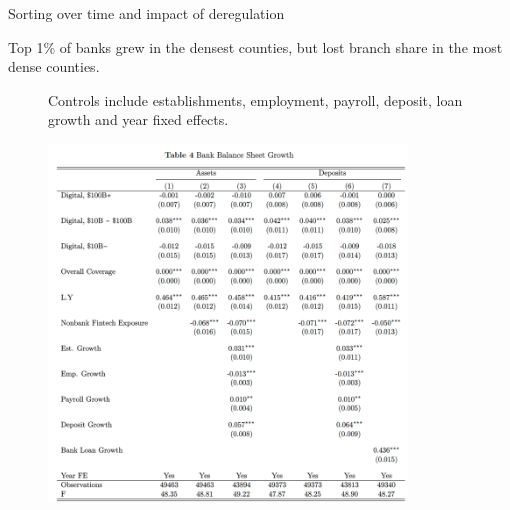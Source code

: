 \documentclass[notes,10pt, aspectratio=169]{beamer}
\newenvironment{wideitemize}{\itemize\addtolength{\itemsep}{10pt}}{\enditemize}
\begin{document}
\begin{frame}{Sorting over time and impact of deregulation}
    \begin{wideitemize}
        \item Top 1\% of banks grew in the densest counties, but lost branch share in the most dense counties. 
\end{wideitemize}

\begin{figure}
\centering
\begin{minipage}{0.9\textwidth}
    {\footnotesize
    Controls include establishments, employment, payroll, deposit, loan growth and year fixed effects.}
    \end{minipage}
\includegraphics[width=0.85\textwidth]{imgs/tab4.png}


\end{figure}
\end{frame}
\end{document}
